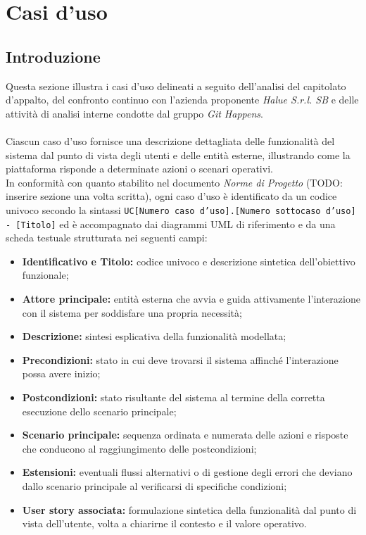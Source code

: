 \section{Casi d'uso}

\subsection{Introduzione}
Questa sezione illustra i casi d'uso delineati a seguito dell'analisi del capitolato d'appalto, del confronto continuo con l'azienda proponente \textit{Halue S.r.l. SB} e delle attività di analisi interne condotte dal gruppo \textit{Git Happens}. \\
\\
Ciascun caso d'uso fornisce una descrizione dettagliata delle funzionalità del sistema dal punto di vista degli utenti e delle entità esterne, illustrando come la piattaforma risponde a determinate azioni o scenari operativi. \\
In conformità con quanto stabilito nel documento \textit{Norme di Progetto} (TODO: inserire sezione una volta scritta), ogni caso d'uso è identificato da un codice univoco secondo la sintassi \texttt{UC[Numero caso d'uso].[Numero sottocaso d'uso] - [Titolo]} ed è accompagnato dai diagrammi UML di riferimento e da una scheda testuale strutturata nei seguenti campi:
\begin{itemize}
    \item \textbf{Identificativo e Titolo:} codice univoco e descrizione sintetica dell'obiettivo funzionale;
    \item \textbf{Attore principale:} entità esterna che avvia e guida attivamente l'interazione con il sistema per soddisfare una propria necessità;
    \item \textbf{Descrizione:} sintesi esplicativa della funzionalità modellata;
    \item \textbf{Precondizioni:} stato in cui deve trovarsi il sistema affinché l'interazione possa avere inizio;
    \item \textbf{Postcondizioni:} stato risultante del sistema al termine della corretta esecuzione dello scenario principale;
    \item \textbf{Scenario principale:} sequenza ordinata e numerata delle azioni e risposte che conducono al raggiungimento delle postcondizioni;
    \item \textbf{Estensioni:} eventuali flussi alternativi o di gestione degli errori che deviano dallo scenario principale al verificarsi di specifiche condizioni;
    \item \textbf{User story associata:} formulazione sintetica della funzionalità dal punto di vista dell'utente, volta a chiarirne il contesto e il valore operativo.
\end{itemize}

